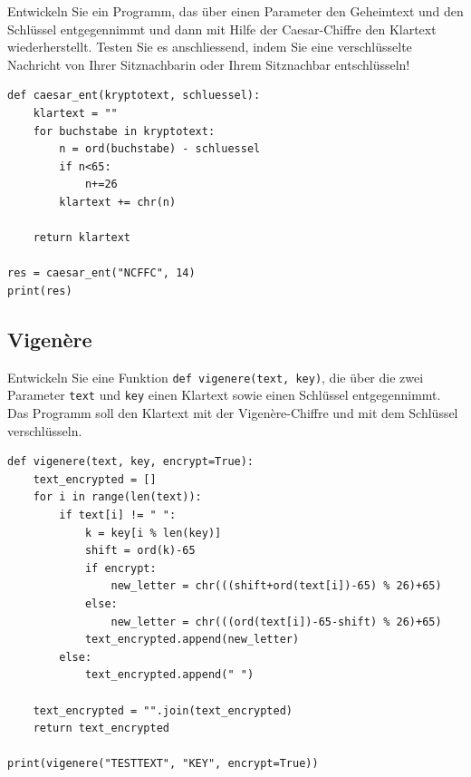 \begin{myexercise}
Entwickeln Sie ein Programm, das über einen Parameter den Geheimtext und den Schlüssel entgegennimmt und dann mit Hilfe der Caesar-Chiffre den Klartext wiederherstellt. Testen Sie es anschliessend, indem Sie eine verschlüsselte Nachricht von Ihrer Sitznachbarin oder Ihrem Sitznachbar entschlüsseln!

\begin{myanswer}
\begin{lstlisting}
def caesar_ent(kryptotext, schluessel):
    klartext = ""
    for buchstabe in kryptotext:
        n = ord(buchstabe) - schluessel
        if n<65:
            n+=26
        klartext += chr(n)
        
    return klartext

res = caesar_ent("NCFFC", 14)
print(res)
\end{lstlisting}
\end{myanswer}
\end{myexercise}

\subsection{Vigenère}

\begin{myexercise}\label{ex:vig}
Entwickeln Sie eine Funktion \lstinline|def vigenere(text, key)|, die über die zwei Parameter \lstinline|text| und \lstinline|key| einen Klartext sowie einen Schlüssel entgegennimmt. Das Programm soll den Klartext mit der Vigenère-Chiffre und mit dem Schlüssel verschlüsseln.
\begin{myanswer}
\begin{lstlisting}
def vigenere(text, key, encrypt=True):
    text_encrypted = []
    for i in range(len(text)):
        if text[i] != " ":
            k = key[i % len(key)]
            shift = ord(k)-65
            if encrypt:
                new_letter = chr(((shift+ord(text[i])-65) % 26)+65)
            else:
                new_letter = chr(((ord(text[i])-65-shift) % 26)+65)
            text_encrypted.append(new_letter)
        else:
            text_encrypted.append(" ")

    text_encrypted = "".join(text_encrypted)
    return text_encrypted
    
print(vigenere("TESTTEXT", "KEY", encrypt=True))
\end{lstlisting}
\end{myanswer}
\end{myexercise}

